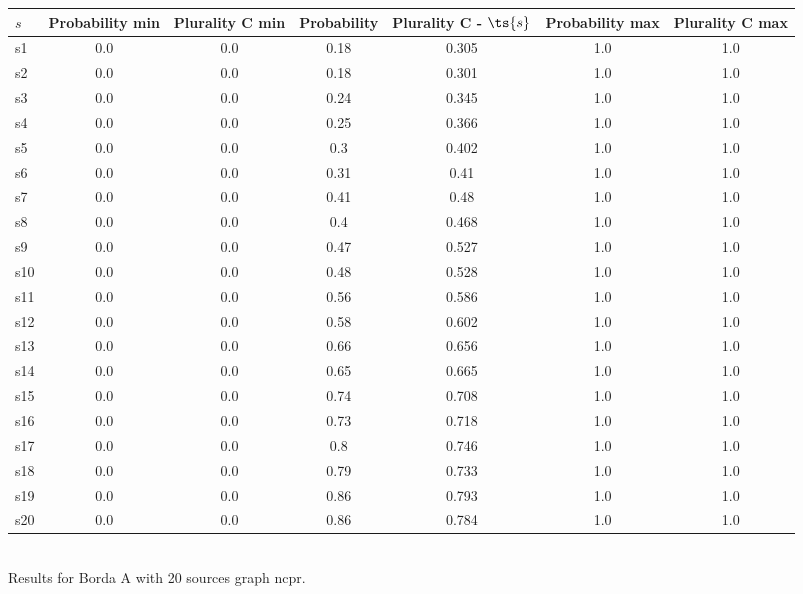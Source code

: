 \documentclass{article}
\begin{document}
\noindent\begin{tabular}{|l|c|c|c|c|c|c|}
\hline
$s$& Probability min & Plurality C min & Probability & Plurality C - $\ts{s}$ & Probability max & Plurality C max\\
\hline
s1 &0.0 & 0.0 & 0.18 & 0.305 & 1.0 & 1.0\\
\hline
s2 &0.0 & 0.0 & 0.18 & 0.301 & 1.0 & 1.0\\
\hline
s3 &0.0 & 0.0 & 0.24 & 0.345 & 1.0 & 1.0\\
\hline
s4 &0.0 & 0.0 & 0.25 & 0.366 & 1.0 & 1.0\\
\hline
s5 &0.0 & 0.0 & 0.3 & 0.402 & 1.0 & 1.0\\
\hline
s6 &0.0 & 0.0 & 0.31 & 0.41 & 1.0 & 1.0\\
\hline
s7 &0.0 & 0.0 & 0.41 & 0.48 & 1.0 & 1.0\\
\hline
s8 &0.0 & 0.0 & 0.4 & 0.468 & 1.0 & 1.0\\
\hline
s9 &0.0 & 0.0 & 0.47 & 0.527 & 1.0 & 1.0\\
\hline
s10 &0.0 & 0.0 & 0.48 & 0.528 & 1.0 & 1.0\\
\hline
s11 &0.0 & 0.0 & 0.56 & 0.586 & 1.0 & 1.0\\
\hline
s12 &0.0 & 0.0 & 0.58 & 0.602 & 1.0 & 1.0\\
\hline
s13 &0.0 & 0.0 & 0.66 & 0.656 & 1.0 & 1.0\\
\hline
s14 &0.0 & 0.0 & 0.65 & 0.665 & 1.0 & 1.0\\
\hline
s15 &0.0 & 0.0 & 0.74 & 0.708 & 1.0 & 1.0\\
\hline
s16 &0.0 & 0.0 & 0.73 & 0.718 & 1.0 & 1.0\\
\hline
s17 &0.0 & 0.0 & 0.8 & 0.746 & 1.0 & 1.0\\
\hline
s18 &0.0 & 0.0 & 0.79 & 0.733 & 1.0 & 1.0\\
\hline
s19 &0.0 & 0.0 & 0.86 & 0.793 & 1.0 & 1.0\\
\hline
s20 &0.0 & 0.0 & 0.86 & 0.784 & 1.0 & 1.0\\
\hline
\end{tabular}\\

\noindent Results for Borda A with 20 sources graph ncpr.
\end{document}
